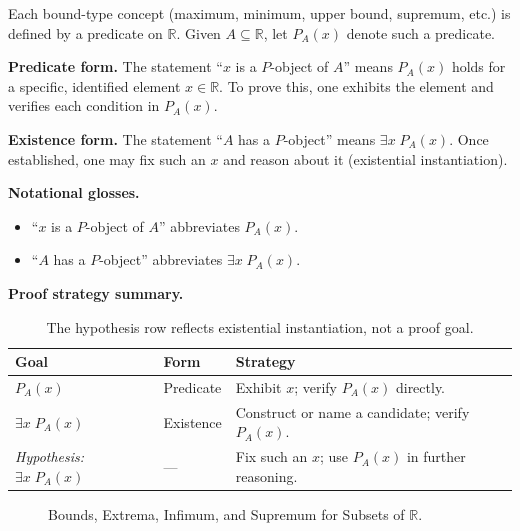 \begin{remark*}
Each bound-type concept (maximum, minimum, upper bound, supremum, etc.)
is defined by a predicate on $\mathbb{R}$. Given $A \subseteq \mathbb{R}$,
let $P_A(x)$ denote such a predicate.

\medskip
\textbf{Predicate form.}
The statement ``$x$ is a $P$-object of $A$'' means $P_A(x)$ holds for a
specific, identified element $x \in \mathbb{R}$. To prove this, one
exhibits the element and verifies each condition in $P_A(x)$.

\medskip
\textbf{Existence form.}
The statement ``$A$ has a $P$-object'' means $\exists x\; P_A(x)$.
Once established, one may fix such an $x$ and reason about it
(existential instantiation).

\medskip
\textbf{Notational glosses.}
\begin{itemize}
  \item ``$x$ is a $P$-object of $A$'' abbreviates $P_A(x)$.
  \item ``$A$ has a $P$-object'' abbreviates $\exists x\; P_A(x)$.
\end{itemize}

\medskip
\textbf{Proof strategy summary.}
\begin{table}[h]
\centering
\renewcommand{\arraystretch}{1.4}
\begin{tabular}{@{} p{4cm} p{3cm} p{6cm} @{}}
\toprule
\textbf{Goal} & \textbf{Form} & \textbf{Strategy} \\
\midrule
$P_A(x)$ & Predicate & Exhibit $x$; verify $P_A(x)$ directly. \\
\addlinespace[0.3em]
$\exists x\; P_A(x)$ & Existence & Construct or name a candidate; verify $P_A(x)$. \\
\midrule
\textit{Hypothesis:} $\exists x\; P_A(x)$ & --- & Fix such an $x$; use $P_A(x)$ in further reasoning. \\
\bottomrule
\end{tabular}
\caption*{\footnotesize The hypothesis row reflects existential instantiation,
not a proof goal.}
\end{table}
\end{remark*}

\begin{figure}[h]
    \centering
    
    \caption{Bounds, Extrema, Infimum, and Supremum for Subsets of $\mathbb{R}$.}
    \label{fig:bounds-extrema}
\end{figure}

